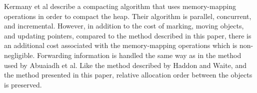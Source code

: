 Kermany et al \cite{Kermany:2006:CCI:1133981.1134023} describe a
compacting algorithm that uses memory-mapping operations in order to
compact the heap.  Their algorithm is parallel, concurrent, and
incremental.  However, in addition to the cost of marking, moving
objects, and updating pointers, compared to the method described in
this paper, there is an additional cost associated with the
memory-mapping operations which is non-negligible.  Forwarding
information is handled the same way as in the method used by Abuaiadh
et al.  Like the method described by Haddon and Waite, and the method
presented in this paper, relative allocation order between the objects
is preserved.
